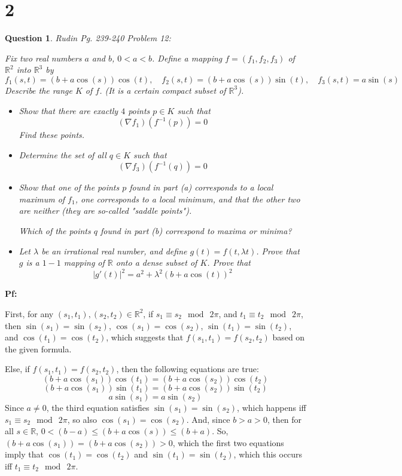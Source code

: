 \documentclass{article}
\newtheorem{question}{Question}
\begin{document}
\section*{2}
\begin{myBox}[]{}
    \begin{question}
        Rudin Pg. 239-240 Problem 12:

        Fix two real numbers $a$ and $b$, $0<a<b$. Define a mapping $f=(f_1,f_2,f_3)$ of $\mathbb{R}^2$ into $\mathbb{R}^3$ by 
        $$f_1(s,t)=(b+a\cos(s))\cos(t),\quad f_2(s,t)=(b+a\cos(s))\sin(t),\quad f_3(s,t)=a\sin(s)$$
        Describe the range $K$ of $f$. (It is a certain compact subset of $\mathbb{R}^3$).

        \begin{itemize}
            \item[(a)] Show that there are exactly $4$ points $p\in K$ such that 
            $$(\nabla f_1)(f^{-1}(p))=0$$
            Find these points.
            \item[(b)] Determine the set of all $q\in K$ such that 
            $$(\nabla f_3)(f^{-1}(q))=0$$
            \item[(c)] Show that one of the points $p$ found in part (a) corresponds to a local maximum of $f_1$, one corresponds to a local minimum, and that the other two are neither (they are so-called "saddle points").
            
            Which of the points $q$ found in part (b) correspond to maxima or minima?
            \item[(d)] Let $\lambda$ be an irrational real number, and define $g(t)=f(t,\lambda t)$. Prove that $g$ is a $1-1$ mapping of $\mathbb{R}$ onto a dense subset of $K$. Prove that
            $$|g'(t)|^2 = a^2+\lambda^2(b+a\cos(t))^2$$
        \end{itemize}
    \end{question}
\end{myBox}

\textbf{Pf:}

First, for any $(s_1,t_1), (s_2,t_2)\in\mathbb{R}^2$, if $s_1\equiv s_2\mod\ 2\pi$, and $t_1\equiv t_2\mod\ 2\pi$, then $\sin(s_1)=\sin(s_2)$, $\cos(s_1)=\cos(s_2)$, $\sin(t_1)=\sin(t_2)$, and $\cos(t_1)=\cos(t_2)$,
which suggests that $f(s_1,t_1)=f(s_2,t_2)$ based on the given formula.

Else, if $f(s_1,t_1)=f(s_2,t_2)$, then the following equations are true:
$$(b+a\cos(s_1))\cos(t_1)=(b+a\cos(s_2))\cos(t_2)$$
$$(b+a\cos(s_1))\sin(t_1)=(b+a\cos(s_2))\sin(t_2)$$
$$a\sin(s_1)=a\sin(s_2)$$
Since $a\neq 0$, the third equation satisfies $\sin(s_1)=\sin(s_2)$, which happens iff $s_1\equiv s_2\mod\ 2\pi$, so also $\cos(s_1)=\cos(s_2)$.
And, since $b>a>0$, then for all $s\in\mathbb{R}$, $0<(b-a)\leq(b+a\cos(s))\leq (b+a)$. So, $(b+a\cos(s_1))=(b+a\cos(s_2))>0$,
which the first two equations imply that $\cos(t_1)=\cos(t_2)$ and $\sin(t_1)=\sin(t_2)$, which this occurs iff $t_1 \equiv t_2\mod\ 2\pi$.
\end{document}
